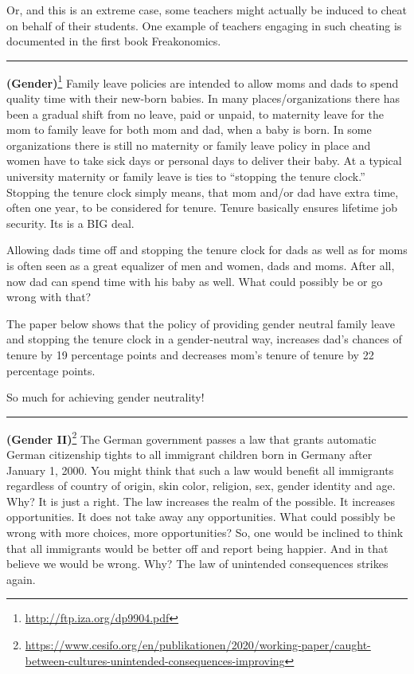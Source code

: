 \documentclass[
]{book}
\begin{document}
Or, and this is an extreme case, some teachers might actually be induced to cheat on behalf of their students. One example of teachers engaging in such cheating is documented in the first book Freakonomics.

\begin{center}\rule{0.5\linewidth}{0.5pt}\end{center}

\textbf{(Gender)}\footnote{\url{http://ftp.iza.org/dp9904.pdf}} Family leave policies are intended to allow moms and dads to spend quality time with their new-born babies. In many places/organizations there has been a gradual shift from no leave, paid or unpaid, to maternity leave for the mom to family leave for both mom and dad, when a baby is born. In some organizations there is still no maternity or family leave policy in place and women have to take sick days or personal days to deliver their baby. At a typical university maternity or family leave is ties to ``stopping the tenure clock.'' Stopping the tenure clock simply means, that mom and/or dad have extra time, often one year, to be considered for tenure. Tenure basically ensures lifetime job security. Its is a BIG deal.

Allowing dads time off and stopping the tenure clock for dads as well as for moms is often seen as a great equalizer of men and women, dads and moms. After all, now dad can spend time with his baby as well. What could possibly be or go wrong with that?

The paper below shows that the policy of providing gender neutral family leave and stopping the tenure clock in a gender-neutral way, increases dad's chances of tenure by 19 percentage points and decreases mom's tenure of tenure by 22 percentage points.

So much for achieving gender neutrality!

\begin{center}\rule{0.5\linewidth}{0.5pt}\end{center}

\textbf{(Gender II)}\footnote{\url{https://www.cesifo.org/en/publikationen/2020/working-paper/caught-between-cultures-unintended-consequences-improving}} The German government passes a law that grants automatic German citizenship tights to all immigrant children born in Germany after January 1, 2000. You might think that such a law would benefit all immigrants regardless of country of origin, skin color, religion, sex, gender identity and age. Why? It is just a right. The law increases the realm of the possible. It increases opportunities. It does not take away any opportunities. What could possibly be wrong with more choices, more opportunities? So, one would be inclined to think that all immigrants would be better off and report being happier. And in that believe we would be wrong. Why? The law of unintended consequences strikes again.
\end{document}
